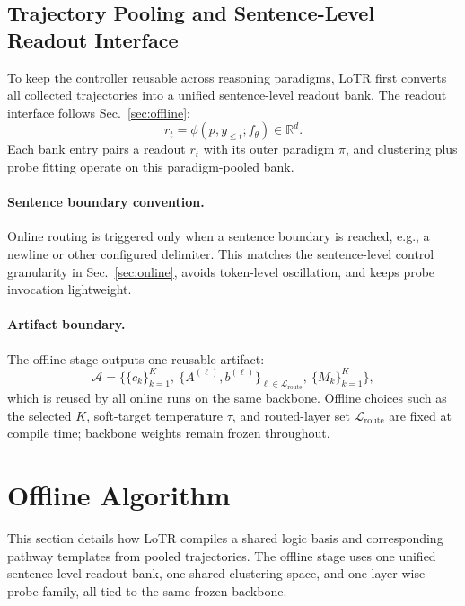 \subsection{Trajectory Pooling and Sentence-Level Readout Interface}
\label{app:alg_pipeline_readout}

To keep the controller reusable across reasoning paradigms, LoTR first converts all collected trajectories into a unified sentence-level readout bank. The readout interface follows Sec.~\ref{sec:offline}:
\begin{equation}
r_t=\phi(p,y_{\le t};f_\theta)\in\mathbb{R}^d.
\label{eq:app_readout_interface}
\end{equation}
Each bank entry pairs a readout \(r_t\) with its outer paradigm \(\pi\), and clustering plus probe fitting operate on this paradigm-pooled bank.

\paragraph{Sentence boundary convention.}
Online routing is triggered only when a sentence boundary is reached, e.g., a newline or other configured delimiter. This matches the sentence-level control granularity in Sec.~\ref{sec:online}, avoids token-level oscillation, and keeps probe invocation lightweight.

\paragraph{Artifact boundary.}
The offline stage outputs one reusable artifact:
\begin{equation}
\mathcal{A}=\{\{c_k\}_{k=1}^K,\ \{A^{(\ell)},b^{(\ell)}\}_{\ell\in\mathcal{L}_{\mathrm{route}}},\ \{M_k\}_{k=1}^K\},
\label{eq:app_artifact_bundle}
\end{equation}
which is reused by all online runs on the same backbone. Offline choices such as the selected \(K\), soft-target temperature \(\tau\), and routed-layer set \(\mathcal{L}_{\mathrm{route}}\) are fixed at compile time; backbone weights remain frozen throughout.

\section{Offline Algorithm}
\label{app:alg_offline}

This section details how LoTR compiles a shared logic basis and corresponding pathway templates from pooled trajectories. The offline stage uses one unified sentence-level readout bank, one shared clustering space, and one layer-wise probe family, all tied to the same frozen backbone.

